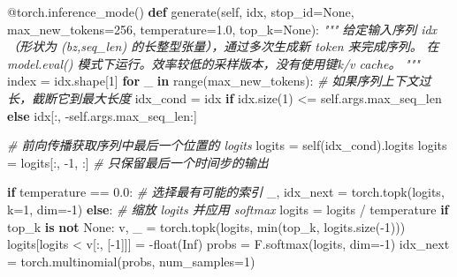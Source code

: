 \documentclass[
]{article}
\newenvironment{Shaded}{}{}
\newcommand{\AttributeTok}[1]{\textcolor[rgb]{0.49,0.56,0.16}{#1}}
\newcommand{\BuiltInTok}[1]{\textcolor[rgb]{0.00,0.50,0.00}{#1}}
\newcommand{\CommentTok}[1]{\textcolor[rgb]{0.38,0.63,0.69}{\textit{#1}}}
\newcommand{\ControlFlowTok}[1]{\textcolor[rgb]{0.00,0.44,0.13}{\textbf{#1}}}
\newcommand{\DecValTok}[1]{\textcolor[rgb]{0.25,0.63,0.44}{#1}}
\newcommand{\FloatTok}[1]{\textcolor[rgb]{0.25,0.63,0.44}{#1}}
\newcommand{\KeywordTok}[1]{\textcolor[rgb]{0.00,0.44,0.13}{\textbf{#1}}}
\newcommand{\NormalTok}[1]{#1}
\newcommand{\OperatorTok}[1]{\textcolor[rgb]{0.40,0.40,0.40}{#1}}
\newcommand{\StringTok}[1]{\textcolor[rgb]{0.25,0.44,0.63}{#1}}
\newcommand{\VariableTok}[1]{\textcolor[rgb]{0.10,0.09,0.49}{#1}}
\begin{document}
\begin{Shaded}
\begin{Highlighting}[]
\AttributeTok{@torch.inference\_mode}\NormalTok{()}
    \KeywordTok{def}\NormalTok{ generate(}\VariableTok{self}\NormalTok{, idx, stop\_id}\OperatorTok{=}\VariableTok{None}\NormalTok{, max\_new\_tokens}\OperatorTok{=}\DecValTok{256}\NormalTok{, temperature}\OperatorTok{=}\FloatTok{1.0}\NormalTok{, top\_k}\OperatorTok{=}\VariableTok{None}\NormalTok{):}
        \CommentTok{"""}
\CommentTok{        给定输入序列 idx（形状为 (bz,seq\_len) 的长整型张量），通过多次生成新 token 来完成序列。}
\CommentTok{        在 model.eval() 模式下运行。效率较低的采样版本，没有使用键k/v cache。}
\CommentTok{        """}
\NormalTok{        index }\OperatorTok{=}\NormalTok{ idx.shape[}\DecValTok{1}\NormalTok{]}
        \ControlFlowTok{for}\NormalTok{ \_ }\KeywordTok{in} \BuiltInTok{range}\NormalTok{(max\_new\_tokens):}
            \CommentTok{\# 如果序列上下文过长，截断它到最大长度}
\NormalTok{            idx\_cond }\OperatorTok{=}\NormalTok{ idx }\ControlFlowTok{if}\NormalTok{ idx.size(}\DecValTok{1}\NormalTok{) }\OperatorTok{\textless{}=} \VariableTok{self}\NormalTok{.args.max\_seq\_len }\ControlFlowTok{else}\NormalTok{ idx[:, }\OperatorTok{{-}}\VariableTok{self}\NormalTok{.args.max\_seq\_len:]}
            
            \CommentTok{\# 前向传播获取序列中最后一个位置的 logits}
\NormalTok{            logits }\OperatorTok{=} \VariableTok{self}\NormalTok{(idx\_cond).logits}
\NormalTok{            logits }\OperatorTok{=}\NormalTok{ logits[:, }\OperatorTok{{-}}\DecValTok{1}\NormalTok{, :] }\CommentTok{\# 只保留最后一个时间步的输出}
            
            \ControlFlowTok{if}\NormalTok{ temperature }\OperatorTok{==} \FloatTok{0.0}\NormalTok{:}
                \CommentTok{\# 选择最有可能的索引}
\NormalTok{                \_, idx\_next }\OperatorTok{=}\NormalTok{ torch.topk(logits, k}\OperatorTok{=}\DecValTok{1}\NormalTok{, dim}\OperatorTok{={-}}\DecValTok{1}\NormalTok{)}
            \ControlFlowTok{else}\NormalTok{:}
                \CommentTok{\# 缩放 logits 并应用 softmax}
\NormalTok{                logits }\OperatorTok{=}\NormalTok{ logits }\OperatorTok{/}\NormalTok{ temperature}
                \ControlFlowTok{if}\NormalTok{ top\_k }\KeywordTok{is} \KeywordTok{not} \VariableTok{None}\NormalTok{:}
\NormalTok{                    v, \_ }\OperatorTok{=}\NormalTok{ torch.topk(logits, }\BuiltInTok{min}\NormalTok{(top\_k, logits.size(}\OperatorTok{{-}}\DecValTok{1}\NormalTok{)))}
\NormalTok{                    logits[logits }\OperatorTok{\textless{}}\NormalTok{ v[:, [}\OperatorTok{{-}}\DecValTok{1}\NormalTok{]]] }\OperatorTok{=} \OperatorTok{{-}}\BuiltInTok{float}\NormalTok{(}\StringTok{\textquotesingle{}Inf\textquotesingle{}}\NormalTok{)}
\NormalTok{                probs }\OperatorTok{=}\NormalTok{ F.softmax(logits, dim}\OperatorTok{={-}}\DecValTok{1}\NormalTok{)}
\NormalTok{                idx\_next }\OperatorTok{=}\NormalTok{ torch.multinomial(probs, num\_samples}\OperatorTok{=}\DecValTok{1}\NormalTok{)}
            


\end{Highlighting}
\end{Shaded}
\end{document}
